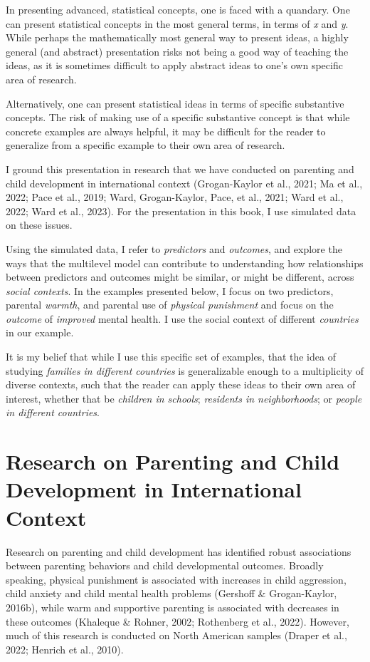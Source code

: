 \documentclass[
  letterpaper,
  DIV=11,
  numbers=noendperiod]{scrreprt}
\begin{document}
In presenting advanced, statistical concepts, one is faced with a
quandary. One can present statistical concepts in the most general
terms, in terms of \emph{x} and \emph{y}. While perhaps the
mathematically most general way to present ideas, a highly general (and
abstract) presentation risks not being a good way of teaching the ideas,
as it is sometimes difficult to apply abstract ideas to one's own
specific area of research.

Alternatively, one can present statistical ideas in terms of specific
substantive concepts. The risk of making use of a specific substantive
concept is that while concrete examples are always helpful, it may be
difficult for the reader to generalize from a specific example to their
own area of research.

I ground this presentation in research that we have conducted on
parenting and child development in international context (Grogan-Kaylor
et al., 2021; Ma et al., 2022; Pace et al., 2019; Ward, Grogan-Kaylor,
Pace, et al., 2021; Ward et al., 2022; Ward et al., 2023). For the
presentation in this book, I use simulated data on these issues.

Using the simulated data, I refer to \emph{predictors} and
\emph{outcomes}, and explore the ways that the multilevel model can
contribute to understanding how relationships between predictors and
outcomes might be similar, or might be different, across \emph{social
contexts}. In the examples presented below, I focus on two predictors,
parental \emph{warmth}, and parental use of \emph{physical punishment}
and focus on the \emph{outcome} of \emph{improved} mental health. I use
the social context of different \emph{countries} in our example.

It is my belief that while I use this specific set of examples, that the
idea of studying \emph{families in different countries} is generalizable
enough to a multiplicity of diverse contexts, such that the reader can
apply these ideas to their own area of interest, whether that be
\emph{children in schools}; \emph{residents in neighborhoods}; or
\emph{people in different countries}.

\section{Research on Parenting and Child Development in International
Context}\label{research-on-parenting-and-child-development-in-international-context}

Research on parenting and child development has identified robust
associations between parenting behaviors and child developmental
outcomes. Broadly speaking, physical punishment is associated with
increases in child aggression, child anxiety and child mental health
problems (Gershoff \& Grogan-Kaylor, 2016b), while warm and supportive
parenting is associated with decreases in these outcomes (Khaleque \&
Rohner, 2002; Rothenberg et al., 2022). However, much of this research
is conducted on North American samples (Draper et al., 2022; Henrich et
al., 2010).
\end{document}
